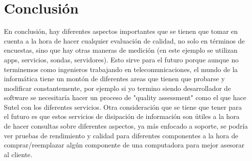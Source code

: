 \documentclass[stu, 12pt, letterpaper, donotrepeattitle, floatsintext, natbib, helv]{apa7}
\begin{document}
\section*{Conclusión}
{}

\quad En conclusión, hay diferentes aspectos importantes que se tienen que tomar en cuenta a la hora de hacer cualquier evaluación de calidad, no solo en términos de encuestas, sino que hay otras maneras de medición (en este ejemplo se utilizan apps, servicios, sondas, servidores). Esto sirve para el futuro porque aunque no terminemos como ingenieros trabajando en telecomunicaciones, el mundo de la informática tiene un montón de diferentes areas que tienen que probarse y modificar constantemente, por ejemplo si yo termino siendo desarrollador de software se necesitaría hacer un proceso de "quality assessment" como el que hace Sutel con los diferentes servicios. Otra consideración que se tiene que tener para el futuro es que estos servicios de disipación de información son útiles a la hora de hacer consultas sobre diferentes aspectos, ya más enfocado a soporte, se podría ver pruebas de rendimiento y calidad para diferentes componentes a la hora de comprar/reemplazar algún componente de una computadora para mejor asesorar al cliente.

\newpage
\renewcommand\refname{\large\textbf{Referencias}}
% 
\end{document}
